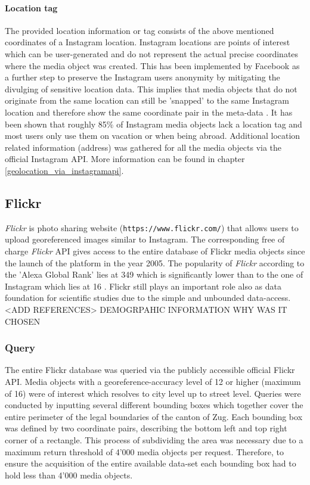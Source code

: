 \paragraph{Location tag} \label{instagram_location_tag}
The provided location information or tag consists of the above mentioned coordinates of a Instagram location. Instagram locations are points of interest which can be user-generated and do not represent the actual precise coordinates where the media object was created. This has been implemented by Facebook as a further step to preserve the Instagram users anonymity by mitigating the divulging of sensitive location data. This implies that media objects that do not originate from the same location can still be 'snapped' to the same Instagram location and therefore show the same coordinate pair in the meta-data \parencite{Instagram}.
It has been shown that roughly 85\% of Instagram media objects lack a location tag \parencite{Flatow2015} and most users only use them on vacation or when being abroad.
Additional location related information (address) was gathered for all the media objects via the official Instagram API. More information can be found in chapter \ref{geolocation_via_instagramapi}.

\subsection{Flickr} \label{flickr}
\textit{Flickr} is photo sharing website (\texttt{https://www.flickr.com/}) that allows users to upload georeferenced images similar to Instagram. The corresponding free of charge \textit{Flickr} API gives access to the entire database of Flickr media objects since the launch of the platform in the year 2005. The popularity of \textit{Flickr} according to the 'Alexa Global Rank' lies at 349 \parencite{Alexa.com2019a} which is significantly lower than to the one of Instagram which lies at 16 \parencite{Alexa.com2019}. Flickr still plays an important role also as data foundation for scientific studies due to the simple and unbounded data-access. <ADD REFERENCES>
DEMOGRPAHIC INFORMATION
WHY WAS IT CHOSEN
\subsubsection{Query} \label{flickr_query}
The entire Flickr database was queried via the publicly accessible official Flickr API. Media objects with a georeference-accuracy level of 12 or higher (maximum of 16) were of interest which resolves to city level up to street level. Queries were conducted by inputting several different bounding boxes which together cover the entire perimeter of the legal boundaries of the canton of Zug. Each bounding box was defined by two coordinate pairs, describing the bottom left and top right corner of a rectangle. This process of subdividing the area was necessary due to a maximum return threshold of 4'000 media objects per request. Therefore, to ensure the acquisition of the entire available data-set each bounding box had to hold less than 4'000 media objects.
